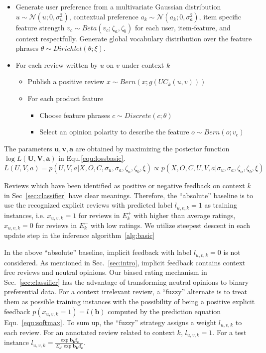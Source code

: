 \documentclass[sigconf]{acmart}
\begin{document}
\begin{itemize}
	\item Generate user preference from a multivariate Gaussian distribution $u\sim \mathcal{N}(u;0,\sigma_u^2)$, contextual preference $a_k\sim \mathcal{N}(a_k;0,\sigma_a^2)$, item specific feature strength $v_c \sim Beta(v_c;\zeta_a,\zeta_b)$ for each user, item-feature, and context respectfully. Generate global vocabulary distribution over the feature phrases $\theta\sim Dirichlet(\theta;\xi)$.
	\item For each review written by $u$ on $v$ under context $k$
	\begin{itemize}
	\item Publish a positive review $x\sim Bern(x;g(UC_k(u,v)))$
	\item For each product feature
	\begin{itemize}
	\item Choose feature phrases $c\sim Discrete(c;\theta)$
	\item Select an opinion polarity to describe the feature $o \sim Bern(o;v_c)$
	\end{itemize}
	\end{itemize}
\end{itemize}

The parameters $\mathbf{u,v,a}$ are obtained by maximizing the posterior function $\log L(\mathbf{U},\mathbf{V},\mathbf{a})$ in Equ.\ref{equ:lossbasic}.
\begin{equation}\label{equ:lossbasic}
L(U,V,a)=p(U,V,a|X,O,C,\sigma_u,\sigma_a,\zeta_a,\zeta_b,\xi)\propto p(X,O,C,U,V,a|\sigma_u,\sigma_a,\zeta_a,\zeta_b,\xi)
\end{equation}

Reviews which have been identified as positive or negative feedback on context $k$ in Sec~\ref{sec:classifier} have clear meanings. Therefore, the ``absolute'' baseline is to use the recognized explicit reviews with predicted label $l_{u,v,k}=1$ as training instances, i.e. $x_{u,v,k}=1$ for reviews in $E^+_k$ with higher than average ratings, $x_{u,v,k}=0$ for reviews in $E^-_k$ with low ratings. We utilize steepest descent in each update step in the inference algorithm~\ref{alg:basic}  

In the above ``absolute'' baseline, implicit feedback with label $l_{u,v,k}=0$ is not considered. As mentioned in Sec.~\ref{sec:intro}, implicit feedback contains context free reviews and neutral opinions. Our biased rating mechanism in Sec.~\ref{sec:classifier} has the advantage of transforming neutral opinions to binary preferential data. For a context irrelevant review, a ``fuzzy'' alternate is to treat them as possible training instances with the possibility of being a positive explicit feedback $p(x_{u,v,k}=1)=l(\mathbf{b})$ computed by the prediction equation Equ.~\ref{equ:softmax}. To sum up, the ``fuzzy'' strategy assigns a weight $l_{u,v,k}$ to each review. For an annotated review related to context $k$, $l_{u,v,k}=1$. For a test instance  $l_{u,v,k}= \frac{\exp{\mathbf{b_k}\mathbf{f_e}}}{\Sigma_{k'} \exp{\mathbf{b_{k'}}\mathbf{f_e}}}$.  
\end{document}
